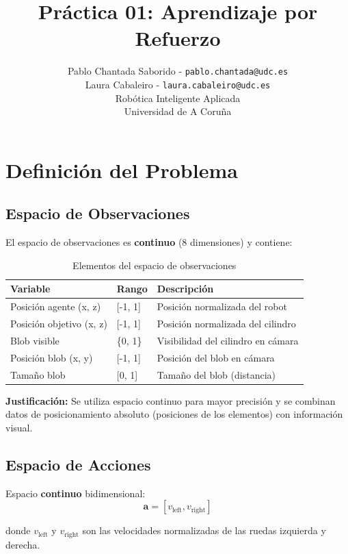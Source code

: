 \documentclass[12pt,a4paper]{article}
\title{\textbf{Práctica 01: Aprendizaje por Refuerzo}}
\author{
    Pablo Chantada Saborido -
    \texttt{pablo.chantada@udc.es}\\
    Laura Cabaleiro -
    \texttt{laura.cabaleiro@udc.es}\\
    Robótica Inteligente Aplicada\\
    Universidad de A Coruña
}
\begin{document}
\maketitle

\section{Definición del Problema}

\subsection{Espacio de Observaciones}

El espacio de observaciones es \textbf{continuo} (8 dimensiones) y contiene:

\begin{table}[H]
\centering
\begin{tabular}{@{}lll@{}}
\toprule
\textbf{Variable} & \textbf{Rango} & \textbf{Descripción} \\ \midrule
Posición agente (x, z) & [-1, 1] & Posición normalizada del robot \\
Posición objetivo (x, z) & [-1, 1] & Posición normalizada del cilindro \\
Blob visible & \{0, 1\} & Visibilidad del cilindro en cámara \\
Posición blob (x, y) & [-1, 1] & Posición del blob en cámara \\
Tamaño blob & [0, 1] & Tamaño del blob (distancia) \\ \bottomrule
\end{tabular}
\caption{Elementos del espacio de observaciones}
\end{table}

\textbf{Justificación:} Se utiliza espacio continuo para mayor precisión y se combinan datos de posicionamiento absoluto (posiciones de los elementos) con información visual.

\subsection{Espacio de Acciones}

Espacio \textbf{continuo} bidimensional:
\begin{equation}
\mathbf{a} = [v_{\text{left}}, v_{\text{right}}]
\end{equation}

donde $v_{\text{left}}$ y $v_{\text{right}}$ son las velocidades normalizadas de las ruedas izquierda y derecha.
\end{document}
